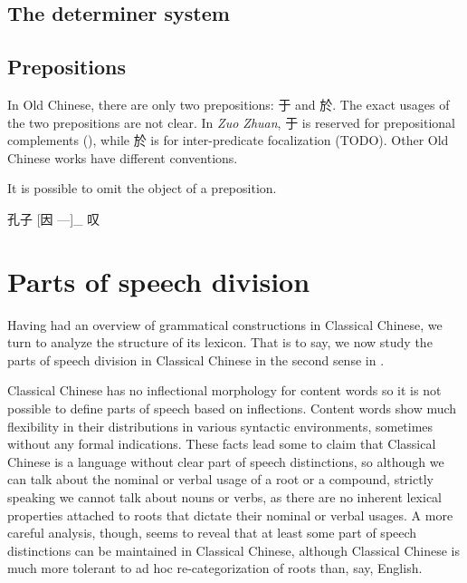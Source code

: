 \documentclass[UTF8, a4paper, oneside, scheme=plain, 12pt]{ctexrep}
\newcommand{\work}[1]{\textit{#1}}
\begin{document}
\subsection{The determiner system}

\subsection{Prepositions}

In Old Chinese, there are only two prepositions: 于 and 於.
The exact usages of the two prepositions are not clear.
In \work{Zuo Zhuan}, 于 is reserved for prepositional complements (),
while 於 is for inter-predicate focalization (TODO).
Other Old Chinese works have different conventions. 

It is possible to omit the object of a preposition.

\begin{exe}
    \ex 孔子 [因 ---]_{} 叹
\end{exe}

\section{Parts of speech division}\label{sec:grammatical.pos}

Having had an overview of grammatical constructions in Classical Chinese,
we turn to analyze the structure of its lexicon.
That is to say, we now study the parts of speech division in Classical Chinese
in the second sense in .

Classical Chinese has no inflectional morphology for content words 
so it is not possible to define parts of speech based on inflections.
Content words show much flexibility 
in their distributions in various syntactic environments,
sometimes without any formal indications.
These facts lead some to claim that Classical Chinese 
is a language without clear part of speech distinctions,
so although we can talk about the nominal or verbal usage of a root or a compound,
strictly speaking we cannot talk about nouns or verbs,
as there are no inherent lexical properties attached to roots
that dictate their nominal or verbal usages. 
A more careful analysis, though, seems to reveal that
at least some part of speech distinctions 
can be maintained in Classical Chinese,
although Classical Chinese is much more tolerant to ad hoc re-categorization of roots than, say, English.
\end{document}
